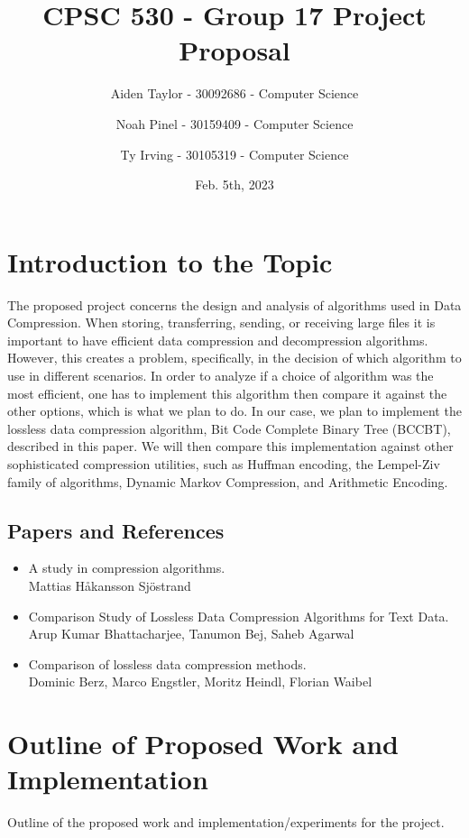 \documentclass[11pt]{article}
\title{CPSC 530 - Group 17 Project Proposal}
\author{
Aiden Taylor - 30092686 - Computer Science
\and
Noah Pinel - 30159409 - Computer Science
\and
Ty Irving - 30105319 - Computer Science
}
\date{Feb. 5th, 2023}
\begin{document}
\maketitle
\newpage

\section*{Introduction to the Topic}
The proposed project concerns the design and analysis of algorithms used in Data Compression.
When storing, transferring, sending, or receiving large files it is important to have efficient data compression and decompression algorithms.
However, this creates a problem, specifically, in the decision of which algorithm to use in different scenarios.
In order to analyze if a choice of algorithm was the most efficient, one has to implement this algorithm then compare it against the other options,
which is what we plan to do.
In our case, we plan to implement
the lossless data compression algorithm, Bit Code Complete Binary Tree (BCCBT), described in this paper. 
We will then compare this implementation against other sophisticated compression utilities,
such as Huffman encoding, the Lempel-Ziv family of algorithms, Dynamic Markov Compression, and Arithmetic Encoding.

\subsection*{Papers and References}
\begin{itemize}
  \item A study in compression algorithms. \\
        Mattias Håkansson Sjöstrand 
  
\item Comparison Study of Lossless Data Compression Algorithms for Text Data. \\
   Arup Kumar Bhattacharjee, Tanumon Bej, Saheb Agarwal 
  
  \item Comparison of lossless data compression methods. \\
       Dominic Berz, Marco Engstler, Moritz Heindl, Florian Waibel  
\end{itemize}

\newpage

\section*{Outline of Proposed Work and Implementation}
Outline of the proposed work and implementation/experiments for the project.
\end{document}
